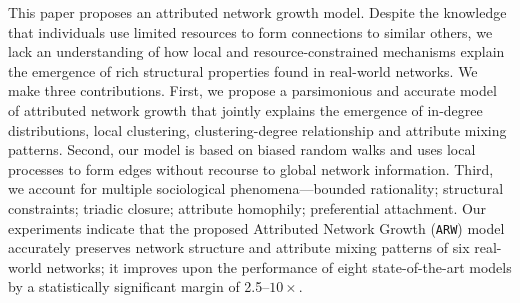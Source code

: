 
This paper proposes an attributed network growth model. Despite the knowledge
that individuals use limited resources to form connections to similar others, we
lack an understanding of how local and resource-constrained mechanisms explain the emergence of rich structural properties found in real-world networks. We make three contributions. First, we
propose a parsimonious and accurate model of attributed network growth that
jointly explains the emergence of in-degree distributions, local clustering,
clustering-degree relationship and attribute mixing patterns. Second, our model
is based on biased random walks and uses local processes to form edges without
recourse to global network information. Third, we account for multiple
sociological phenomena---bounded rationality; structural constraints; triadic
closure; attribute homophily; preferential attachment. Our experiments indicate
that the proposed Attributed Network Growth (\texttt{ARW}) model accurately
preserves network structure and attribute mixing patterns of six real-world
networks; it improves upon the performance of eight state-of-the-art models by a
statistically significant margin of 2.5--$10\times$.

%
%
